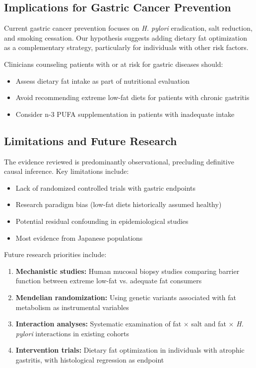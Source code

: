 \documentclass[review]{elsarticle}
\begin{document}
\subsection{Implications for Gastric Cancer Prevention}

Current gastric cancer prevention focuses on \textit{H. pylori} eradication, salt reduction, and smoking cessation. Our hypothesis suggests adding dietary fat optimization as a complementary strategy, particularly for individuals with other risk factors.

Clinicians counseling patients with or at risk for gastric diseases should:
\begin{itemize}
    \item Assess dietary fat intake as part of nutritional evaluation
    \item Avoid recommending extreme low-fat diets for patients with chronic gastritis
    \item Consider n-3 PUFA supplementation in patients with inadequate intake
\end{itemize}

\subsection{Limitations and Future Research}

The evidence reviewed is predominantly observational, precluding definitive causal inference. Key limitations include:

\begin{itemize}
    \item Lack of randomized controlled trials with gastric endpoints
    \item Research paradigm bias (low-fat diets historically assumed healthy)
    \item Potential residual confounding in epidemiological studies
    \item Most evidence from Japanese populations
\end{itemize}

Future research priorities include:

\begin{enumerate}
    \item \textbf{Mechanistic studies:} Human mucosal biopsy studies comparing barrier function between extreme low-fat vs. adequate fat consumers
    \item \textbf{Mendelian randomization:} Using genetic variants associated with fat metabolism as instrumental variables
    \item \textbf{Interaction analyses:} Systematic examination of fat $\times$ salt and fat $\times$ \textit{H. pylori} interactions in existing cohorts
    \item \textbf{Intervention trials:} Dietary fat optimization in individuals with atrophic gastritis, with histological regression as endpoint
\end{enumerate}
\end{document}
